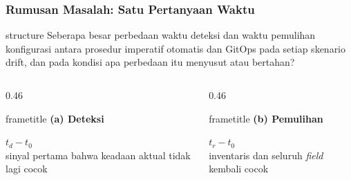 {
\usebackgroundtemplate{\backgroundcontent}
\begin{frame}
    \frametitle{Rumusan Masalah: Satu Pertanyaan Waktu}
    \vspace{0.04cm}
    \begin{beamercolorbox}[wd=\textwidth, sep=0.18cm, rounded=true]{structure}
        \scriptsize
        Seberapa besar perbedaan waktu deteksi dan waktu pemulihan konfigurasi antara prosedur
        imperatif otomatis dan GitOps pada setiap skenario drift, dan pada kondisi apa perbedaan
        itu menyusut atau bertahan?
    \end{beamercolorbox}
    \vspace{0.14cm}
    \begin{columns}[T]
        \begin{column}{0.46\textwidth}
            \begin{beamercolorbox}[wd=\textwidth, sep=0.10cm, center, rounded=true]{frametitle}
                \scriptsize\bfseries (a) Deteksi
            \end{beamercolorbox}
            \vspace{0.04cm}
            \centering\scriptsize $t_d - t_0$\\
            sinyal pertama bahwa keadaan aktual tidak lagi cocok
        \end{column}
        \begin{column}{0.46\textwidth}
            \begin{beamercolorbox}[wd=\textwidth, sep=0.10cm, center, rounded=true]{frametitle}
                \scriptsize\bfseries (b) Pemulihan
            \end{beamercolorbox}
            \vspace{0.04cm}
            \centering\scriptsize $t_r - t_0$\\
            inventaris dan seluruh \textit{field} kembali cocok
        \end{column}
    \end{columns}
    \vspace{0.14cm}
\end{frame}
}

